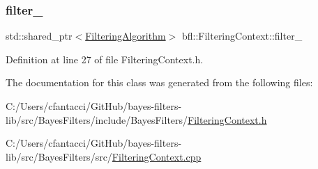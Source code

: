 \subsubsection{\texorpdfstring{filter\+\_\+}{filter\_}}
{\footnotesize\ttfamily std\+::shared\+\_\+ptr$<$\mbox{\hyperlink{classbfl_1_1FilteringAlgorithm}{Filtering\+Algorithm}}$>$ bfl\+::\+Filtering\+Context\+::filter\+\_\+\hspace{0.3cm}{\ttfamily [private]}}



Definition at line 27 of file Filtering\+Context.\+h.



The documentation for this class was generated from the following files\+:\begin{DoxyCompactItemize}
\item 
C\+:/\+Users/cfantacci/\+Git\+Hub/bayes-\/filters-\/lib/src/\+Bayes\+Filters/include/\+Bayes\+Filters/\mbox{\hyperlink{FilteringContext_8h}{Filtering\+Context.\+h}}\item 
C\+:/\+Users/cfantacci/\+Git\+Hub/bayes-\/filters-\/lib/src/\+Bayes\+Filters/src/\mbox{\hyperlink{FilteringContext_8cpp}{Filtering\+Context.\+cpp}}\end{DoxyCompactItemize}
